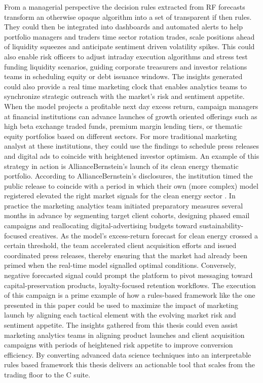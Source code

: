 From a managerial perspective the decision rules extracted from RF forecasts transform an otherwise opaque algorithm into a set of transparent if then rules. They could then be integrated into dashboards and automated alerts to help portfolio managers and traders time sector rotation trades, scale positions ahead of liquidity squeezes and anticipate sentiment driven volatility spikes. This could also enable risk officers to adjust intraday execution algorithms and stress test funding liquidity scenarios, guiding corporate treasurers and investor relations teams in scheduling equity or debt issuance windows. The insights generated could also provide a real time marketing clock that enables analytics teams to synchronize strategic outreach with the market's risk and sentiment appetite. When the model projects a profitable next day excess return, campaign managers at financial institutions can advance launches of growth oriented offerings such as high beta exchange traded funds, premium margin lending tiers, or thematic equity portfolios based on different sectors. For more traditional marketing analyst at these institutions, they could use the findings to schedule press releases and digital ads to coincide with heightened investor optimism. An example of this strategy in action is AllianceBernstein's launch of its clean energy thematic portfolio. According to AllianceBernstein's disclosures, the institution timed the public release to coincide with a period in which their own (more complex) model registered elevated the right market signals for the clean energy sector \cite{alliance_2024}. In practice the marketing analytics team initiated preparatory measures several months in advance by segmenting target client cohorts, designing phased email campaigns and reallocating digital-advertising budgets toward sustainability-focused creatives. As the model's excess-return forecast for clean energy crossed a certain threshold, the team accelerated client acquisition efforts and issued coordinated press releases, thereby ensuring that the market had already been primed when the real-time model signalled optimal conditions. Conversely, negative forecasted signal could prompt the platform to pivot messaging toward capital-preservation products, loyalty-focused retention workflows. The execution of this campaign is a prime example of how a rules-based framework like the one presented in this paper could be used to maximize the impact of marketing launch by aligning each tactical element with the evolving market risk and sentiment appetite. The insights gathered from this thesis could even assist marketing analytics teams in aligning product launches and client acquisition campaigns with periods of heightened risk appetite to improve conversion efficiency. By converting advanced data science techniques into an interpretable rules based framework this thesis delivers an actionable tool that scales from the trading floor to the C suite.



